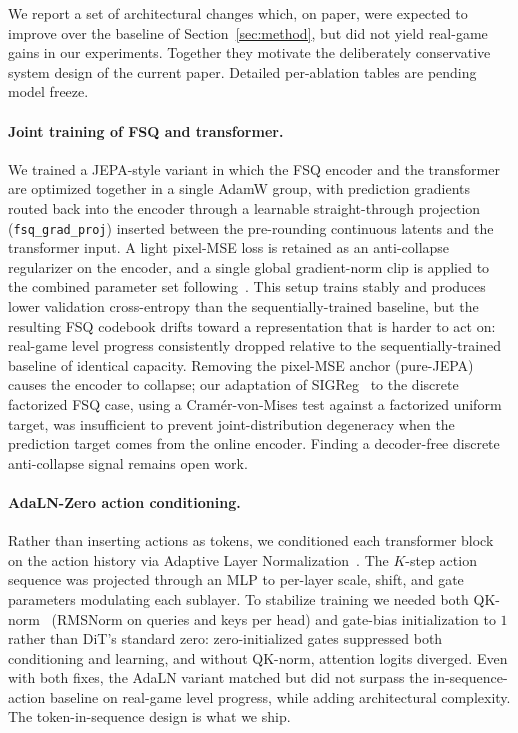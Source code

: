 \documentclass{article}
\begin{document}
We report a set of architectural changes which, on paper, were expected to improve over the baseline of Section~\ref{sec:method}, but did not yield real-game gains in our experiments. Together they motivate the deliberately conservative system design of the current paper. Detailed per-ablation tables are pending model freeze.

\paragraph{Joint training of FSQ and transformer.}
We trained a JEPA-style variant in which the FSQ encoder and the transformer are optimized together in a single AdamW group, with prediction gradients routed back into the encoder through a learnable straight-through projection (\texttt{fsq\_grad\_proj}) inserted between the pre-rounding continuous latents and the transformer input.
A light pixel-MSE loss is retained as an anti-collapse regularizer on the encoder, and a single global gradient-norm clip is applied to the combined parameter set following~\citep{maes2026leworldmodel}.
This setup trains stably and produces lower validation cross-entropy than the sequentially-trained baseline, but the resulting FSQ codebook drifts toward a representation that is harder to act on: real-game level progress consistently dropped relative to the sequentially-trained baseline of identical capacity.
Removing the pixel-MSE anchor (pure-JEPA) causes the encoder to collapse; our adaptation of SIGReg~\citep{maes2026leworldmodel} to the discrete factorized FSQ case, using a Cramér-von-Mises test against a factorized uniform target, was insufficient to prevent joint-distribution degeneracy when the prediction target comes from the online encoder.
Finding a decoder-free discrete anti-collapse signal remains open work.

\paragraph{AdaLN-Zero action conditioning.}
Rather than inserting actions as tokens, we conditioned each transformer block on the action history via Adaptive Layer Normalization~\citep{peebles2023dit, perez2018film}.
The $K$-step action sequence was projected through an MLP to per-layer scale, shift, and gate parameters modulating each sublayer.
To stabilize training we needed both QK-norm~\citep{esser2024sd3} (RMSNorm on queries and keys per head) and gate-bias initialization to $1$ rather than DiT's standard zero: zero-initialized gates suppressed both conditioning and learning, and without QK-norm, attention logits diverged.
Even with both fixes, the AdaLN variant matched but did not surpass the in-sequence-action baseline on real-game level progress, while adding architectural complexity. The token-in-sequence design is what we ship.
\end{document}
